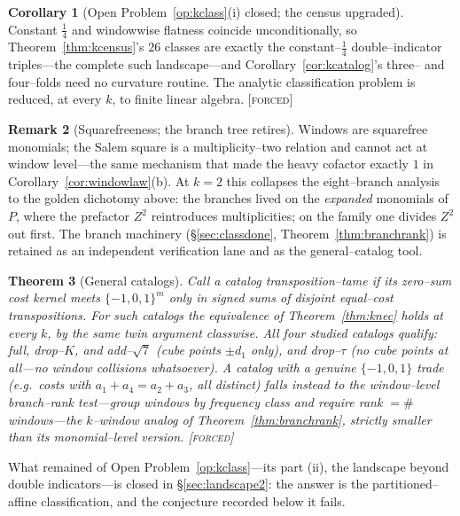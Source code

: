 \documentclass[11pt]{article}
\newtheorem{theorem}{Theorem}[section]
\theoremstyle{definition}
\newtheorem{remark}[theorem]{Remark}
\newtheorem{corollary}[theorem]{Corollary}
\newcommand{\forcedtag}{{\scshape [forced]}}
\begin{document}
\begin{corollary}[Open Problem~\ref{op:kclass}(i) closed; the census upgraded]\label{cor:knecclosed}
Constant $\tfrac14$ and windowwise flatness coincide unconditionally, so
Theorem~\ref{thm:kcensus}'s $26$ classes are exactly the constant--$\tfrac14$ double--indicator
triples---the complete such landscape---and Corollary~\ref{cor:kcatalog}'s three-- and four--folds
need no curvature routine. The analytic classification problem is reduced, at every $k$, to
finite linear algebra. \forcedtag
\end{corollary}

\begin{remark}[Squarefreeness; the branch tree retires]\label{rem:squarefree}
Windows are squarefree monomials; the Salem square is a multiplicity--two relation and cannot act
at window level---the same mechanism that made the heavy cofactor exactly $1$ in
Corollary~\ref{cor:windowlaw}(b). At $k=2$ this collapses the eight--branch analysis to the golden
dichotomy above: the branches lived on the \emph{expanded} monomials of $P$, where the prefactor
$Z^2$ reintroduces multiplicities; on the family one divides $Z^2$ out first. The branch machinery
(\S\ref{sec:classdone}, Theorem~\ref{thm:branchrank}) is retained as an independent verification lane
and as the general--catalog tool.
\end{remark}

\begin{theorem}[General catalogs]\label{thm:tame}
Call a catalog \emph{transposition--tame} if its zero--sum cost kernel meets $\{-1,0,1\}^m$ only
in signed sums of disjoint equal--cost transpositions. For such catalogs the equivalence of
Theorem~\ref{thm:knec} holds at every $k$, by the same twin argument classwise. All four studied
catalogs qualify: full, drop--$K$, and add--$\sqrt7$ (cube points $\pm d_1$ only), and
drop--$\tau$ (no cube points at all---no window collisions whatsoever). A catalog with a genuine
$\{-1,0,1\}$ trade (e.g.\ costs with $a_1+a_4=a_2+a_3$, all distinct) falls instead to the
window--level branch--rank test---group windows by frequency class and require rank
$=\#$windows---the $k$--window analog of Theorem~\ref{thm:branchrank}, strictly smaller than its
monomial--level version. \forcedtag
\end{theorem}

What remained of Open Problem~\ref{op:kclass}---its part (ii), the landscape beyond double
indicators---is closed in \S\ref{sec:landscape2}: the answer is the partitioned--affine
classification, and the conjecture recorded below it fails.
\end{document}
